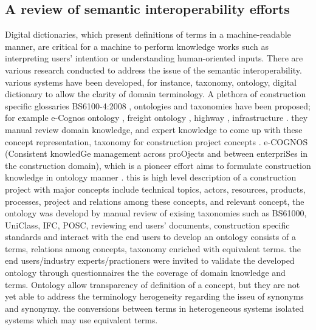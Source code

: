 \documentclass[Journal,InsideFigs, DoubleSpace]{ascelike} %
\begin{document}
\subsection{A review of semantic interoperability efforts}
Digital dictionaries, which present definitions of terms in a machine-readable manner, are critical for a machine to perform knowledge works such as interpreting users' intention or understanding human-oriented inputs. There are various research conducted to address the issue of the semantic interoperability. various systems have been developed, for instance, taxonomy, ontology, digital dictionary to allow the clarity of domain terminology.
A plethora of construction specific glossaries BS6100-4:2008 \cite{bs6100-08}, ontologies and taxonomies have been proposed; for example e-Cognos ontology \cite{wetherill02}, freight ontology \cite{seedah15}, highway \cite{el-diraby05}, infrastructure \cite{osman06}. they manual review domain knowledge, and expert knowledge to come up with these concept representation, taxonomy for construction project concepts \cite{el-diraby05b}. e-COGNOS (Consistent knowledGe management across proOjects and between enterpriSes in the construction domain), which is a pioneer effort aims to formulate construction knowledge in ontology manner \cite{lima05}. this is high level description of a construction project with major concepts include technical topics, actors, resources, products, processes, project and relations among these concepts, and relevant concept,  the ontology was developd by manual review of exising taxonomies such as BS61000, UniClass, IFC, POSC, reviewing end users' documents, construction specific standards and interact with the end users to develop an ontology consists of a terms, relations among concepts, taxonomy enriched with equivalent terms. the end users/industry experts/practioners were invited to validate the developed ontology through questionnaires the the coverage of domain knowledge and terms. 
Ontology allow transparency of definition of a concept, but they are not yet able to address the terminology herogeneity regarding the isseu of synonyms and synonymy. the conversions between terms in heterogeneous systems isolated systems which may use equivalent terms. 
\end{document}
